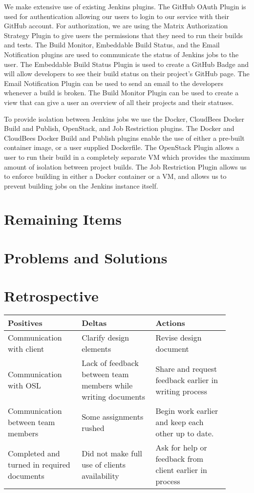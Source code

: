 \documentclass[10pt,onecolumn,journal,draftclsnofoot]{IEEEtran}
\begin{document}
We make extensive use of existing Jenkins plugins.
The GitHub OAuth Plugin is used for authentication allowing our users to login to our service with their GitHub account.
For authorization, we are using the Matrix Authorization Strategy Plugin to give users the permissions that they need to run their builds and tests.
The Build Monitor, Embeddable Build Status, and the Email Notification plugins are used to communicate the status of Jenkins jobs to the user.
The Embeddable Build Status Plugin is used to create a GitHub Badge and will allow developers to see their build status on their project's GitHub page.
The Email Notification Plugin can be used to send an email to the developers whenever a build is broken.
The Build Monitor Plugin can be used to create a view that can give a user an overview of all their projects and their statuses.

To provide isolation between Jenkins jobs we use the Docker, CloudBees Docker Build and Publish, OpenStack, and Job Restriction plugins. 
The Docker and CloudBees Docker Build and Publish plugins enable the use of either a pre-built container image, or a user supplied Dockerfile.
The OpenStack Plugin allows a user to run their build in a completely separate VM which provides the maximum amount of isolation between project builds. 
The Job Restriction Plugin allows us to enforce building in either a Docker container or a VM, and allows us to prevent building jobs on the Jenkins instance itself. 


\section{Remaining Items}

\section{Problems and Solutions}

\section{Retrospective}
\begin{center}
	\begin{tabular}{| p{0.3\linewidth} | p{0.3\linewidth} | p{0.3\linewidth} |}\hline
		Positives & Deltas & Actions \\ \hline
		Communication with client & Clarify design elements 	& Revise design document \\ \hline
		Communication with OSL & Lack of feedback between team members while writing documents & Share and request feedback earlier in writing process \\ \hline
		Communication between team members	& Some assignments rushed & Begin work earlier and keep each other up to date. \\ \hline
		Completed and turned in required documents & Did not make full use of clients availability & Ask for help or feedback from client earlier in process \\ \hline
	\end{tabular}
\end{center}
\end{document}
